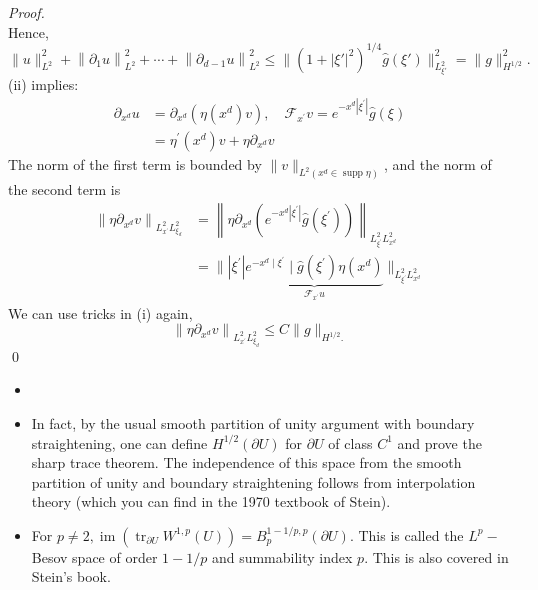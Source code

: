 \begin{proof}
$$$$
Hence,
\[
    \|u\|_{L^{2}}^{2}+\left\|\partial_{1} u\right\|_{L^{2}}^{2}+\cdots+\left\|\partial_{d-1} u\right\|_{L^{2}}^{2} \le \|(1+|\xi'|^2)^{1/4} \hat g(\xi')\|^2_{L_{\xi'}^2} = \|g\|_{H^{1/2}}^2.
\]
(ii) implies:
$$
\begin{aligned}
\partial_{x^{d}} u &=\partial_{x^{d}}\left(\eta\left(x^{d}\right) v\right), \quad \mathcal{F}_{x^{\prime}} v=e^{-x^{d}\left|\xi^{\prime}\right|} \widehat{g}(\xi) \\
&=\eta^{\prime}\left(x^{d}\right) v+\eta \partial_{x^{d}} v
\end{aligned}
$$
The norm of the first term is bounded by $\|v\|_{L^{2}\left(x^{d} \in \operatorname{supp} \eta\right)}$, and the norm of the second term is
$$
\begin{aligned}
\left\|\eta \partial_{x^{d}} v\right\|_{L_{x^{\prime}}^{2} L_{\xi_{d}}^{2}} &=\left\|\eta \partial_{x^{d}}\left(e^{-x^{d}\left|\xi^{\prime}\right|} \widehat{g}\left(\xi^{\prime}\right)\right)\right\|_{L_{\xi^{\prime}}^{2} L_{x^{d}}^{2}} \\
&=\|\left|\xi^{\prime}\right| \underbrace{e^{-x^{d} \mid \xi^{\prime}} \mid \widehat{g}\left(\xi^{\prime}\right) \eta\left(x^{d}\right)}_{\mathcal{F}_{x^{\prime}} u}\|_{L_{\xi^{\prime}}^{2} L_{x^{d}}^{2}}
\end{aligned}
$$
We can use tricks in (i) again, 
$$
\left\|\eta \partial_{x^{d}} v\right\|_{L_{x^{\prime}}^{2} L_{\xi_{d}}^{2}}\leq C\|g\|_{H^{1 / 2} .}
$$
\qed
\end{proof}
\begin{remark}
\begin{itemize}
    \item []
    \item In fact, by the usual smooth partition of unity argument with boundary straightening, one can define $H^{1 / 2}(\partial U)$ for $\partial U$ of class $C^{1}$ and prove the sharp trace theorem. The independence of this space from the smooth partition of unity and boundary straightening follows from interpolation theory (which you can find in the 1970 textbook of Stein).
    \item For $p \neq 2, \operatorname{im}\left(\operatorname{tr}_{\partial U} W^{1, p}(U)\right)=B_{p}^{1-1 / p, p}(\partial U)$. This is called the $L^{p}-$ Besov space of order $1-1 / p$ and summability index $p$. This is also covered in Stein's book.
\end{itemize}
\end{remark}


\newpage
